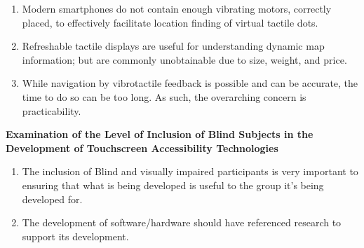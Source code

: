 \documentclass{article}
\begin{document}
\begin{enumerate}
    \item Modern smartphones do not contain enough vibrating motors, correctly placed, to effectively facilitate location finding of virtual tactile dots. 

    \item Refreshable tactile displays are useful for understanding dynamic map information; but are commonly unobtainable due to size, weight, and price. 

    \item While navigation by vibrotactile feedback is possible and can be accurate, the time to do so can be too long. As such, the overarching concern is practicability. 

\end{enumerate}

\cite{thompson2018examination}\textbf{Examination of the Level of Inclusion of Blind Subjects in the Development of Touchscreen Accessibility Technologies }

\begin{enumerate}
    \item The inclusion of Blind and visually impaired participants is very important to ensuring that what is being developed is useful to the group it's being developed for. 

    \item The development of software/hardware should have referenced research to support its development. 

\end{enumerate}



\newpage


\end{document}
